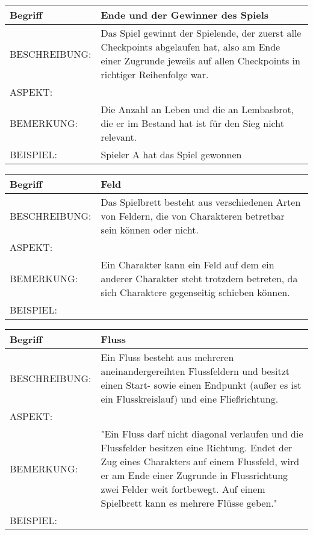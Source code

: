 \documentclass{uulm-assignment}
\begin{document}
	     \begin{tabularx}{\textwidth}{|l|X |} \hline
	        \textbf{Begriff} & \textbf{Ende und der Gewinner des Spiels} \\
	        \hline
	        BESCHREIBUNG: & Das Spiel gewinnt der Spielende, der zuerst alle Checkpoints abgelaufen hat, also am Ende einer Zugrunde jeweils auf allen Checkpoints in richtiger Reihenfolge war. \\
	        \hline
	        ASPEKT: &
	        \\
	        \hline
	        BEMERKUNG: & Die Anzahl an Leben und die an Lembasbrot, die er im Bestand hat ist für den Sieg nicht relevant. \\
	        \hline
	        BEISPIEL: & Spieler A hat das Spiel gewonnen \\
	        \hline
	    \end{tabularx}

	     \begin{tabularx}{\textwidth}{|l|X |} \hline
	        \textbf{Begriff} & \textbf{Feld} \\
	        \hline
	        BESCHREIBUNG: & Das Spielbrett besteht aus verschiedenen Arten von Feldern, die von Charakteren betretbar sein können oder nicht. \\
	        \hline
	        ASPEKT: &
	        \\
	        \hline
	        BEMERKUNG: & Ein Charakter kann ein Feld auf dem ein anderer Charakter steht trotzdem betreten, da sich Charaktere gegenseitig schieben können.\\
	        \hline
	        BEISPIEL: & \\
	        \hline
	    \end{tabularx}

	     \begin{tabularx}{\textwidth}{|l|X |} \hline
	        \textbf{Begriff} & \textbf{Fluss } \\
	        \hline
	        BESCHREIBUNG: & Ein Fluss besteht aus mehreren aneinandergereihten Flussfeldern und besitzt einen Start- sowie einen Endpunkt (außer es ist ein Flusskreislauf) und eine Fließrichtung. \\
	        \hline
	        ASPEKT: &
	        \\
	        \hline
	        BEMERKUNG: & "Ein Fluss darf nicht diagonal verlaufen und die Flussfelder besitzen eine Richtung. Endet der Zug eines Charakters auf einem Flussfeld, wird er am Ende einer Zugrunde in Flussrichtung zwei Felder weit fortbewegt.
	        Auf einem Spielbrett kann es mehrere Flüsse geben."\\
	        \hline
	        BEISPIEL: & \\
	        \hline
	    \end{tabularx}
\end{document}
